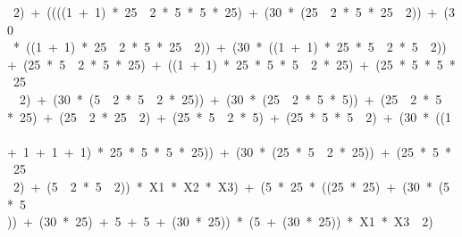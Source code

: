 {\ 2)\ +\ ((((1\ +\ 1)\ *\ 25\ \ 2\ *\ 5\ *\ 5\ *\ 25)\ +\ (30\ *\ (25\ \ 2\ *\ 5\ *\ 25\ \ 2))\ +\ (30\\
\ *\ ((1\ +\ 1)\ *\ 25\ \ 2\ *\ 5\ *\ 25\ \ 2))\ +\ (30\ *\ ((1\ +\ 1)\ *\ 25\ *\ 5\ \ 2\ *\ 5\ \ 2))\ \\
+\ (25\ *\ 5\ \ 2\ *\ 5\ *\ 25)\ +\ ((1\ +\ 1)\ *\ 25\ *\ 5\ *\ 5\ \ 2\ *\ 25)\ +\ (25\ *\ 5\ *\ 5\ *\ 25\\
\ \ 2)\ +\ (30\ *\ (5\ \ 2\ *\ 5\ \ 2\ *\ 25))\ +\ (30\ *\ (25\ \ 2\ *\ 5\ *\ 5))\ +\ (25\ \ 2\ *\ 5\ \\
*\ 25)\ +\ (25\ \ 2\ *\ 25\ \ 2)\ +\ (25\ *\ 5\ \ 2\ *\ 5)\ +\ (25\ *\ 5\ *\ 5\ \ 2)\ +\ (30\ *\ ((1\ \\
+\ 1\ +\ 1\ +\ 1)\ *\ 25\ *\ 5\ *\ 5\ *\ 25))\ +\ (30\ *\ (25\ *\ 5\ \ 2\ *\ 25))\ +\ (25\ *\ 5\ *\ 25\ \\
\ 2)\ +\ (5\ \ 2\ *\ 5\ \ 2))\ *\ X1\ *\ X2\ *\ X3)\ +\ (5\ *\ 25\ *\ ((25\ *\ 25)\ +\ (30\ *\ (5\ *\ 5\\
))\ +\ (30\ *\ 25)\ +\ 5\ +\ 5\ +\ (30\ *\ 25))\ *\ (5\ +\ (30\ *\ 25))\ *\ X1\ *\ X3\ \ 2)\\
}













\bigskip

